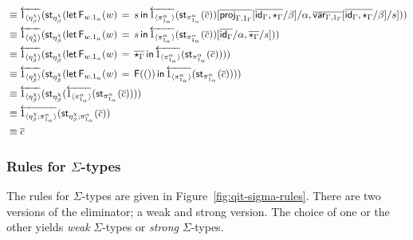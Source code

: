 \documentclass[10pt]{article}
\theoremstyle{definition}
\newcommand{\id}{\mathsf{id}}
\newcommand{\rewrite}[2]{\overleftarrow{#1}(#2)}
\newcommand\StI[2]{\ensuremath{\mathsf{st}_{#1}(#2)}}
\newcommand\FEs[4]{\ensuremath{\mathsf{let} \, \mathsf{F}_{#1}(#3) \, = \, {#2} \, \mathsf{in} \, #4}}
\newcommand\FI[1]{\ensuremath{\mathsf{F}{(#1)}}}
\begin{document}
\begin{enumerate}[style = multiline, labelwidth = 80pt]
\begin{align*}
&\equiv \rewrite{\ApOne{\eta^\chi_\beta}}{\StI{\eta^\chi_\beta}{\FEs{w.1_\alpha}{s}{w}{\rewrite{\ApOne{\pi^\alpha_{1_\alpha}}}{\StI{\pi^\alpha_{1_\alpha}}{\upstairs{c}}}}[\upstairs{\proj{\Gamma, 1_\Gamma}}[\upstairs{\id_\Gamma, \star_\Gamma}/\beta]/\alpha, \upstairs{\qvar{\Gamma, 1_\Gamma}}[\upstairs{\id_\Gamma, \star_\Gamma}/\beta]/s]}} \\
&\equiv \rewrite{\ApOne{\eta^\chi_\beta}}{\StI{\eta^\chi_\beta}{\FEs{w.1_\alpha}{s}{w}{\rewrite{\ApOne{\pi^\alpha_{1_\alpha}}}{\StI{\pi^\alpha_{1_\alpha}}{\upstairs{c}}}}[\upstairs{\id_\Gamma}/\alpha, \upstairs{\star_\Gamma}/s]}} \\
&\equiv \rewrite{\ApOne{\eta^\chi_\beta}}{\StI{\eta^\chi_\beta}{\FEs{w.1_\alpha}{\upstairs{\star_\Gamma}}{w}{\rewrite{\ApOne{\pi^\alpha_{1_\alpha}}}{\StI{\pi^\alpha_{1_\alpha}}{\upstairs{c}}}}}} \\
&\equiv \rewrite{\ApOne{\eta^\chi_\beta}}{\StI{\eta^\chi_\beta}{\FEs{w.1_\alpha}{\FI{()}}{w}{\rewrite{\ApOne{\pi^\alpha_{1_\alpha}}}{\StI{\pi^\alpha_{1_\alpha}}{\upstairs{c}}}}}} \\
&\equiv \rewrite{\ApOne{\eta^\chi_\beta}}{\StI{\eta^\chi_\beta}{\rewrite{\ApOne{\pi^\alpha_{1_\alpha}}}{\StI{\pi^\alpha_{1_\alpha}}{\upstairs{c}}}}} \\
&\equiv \rewrite{\ApOne{\eta^\chi_\beta;\pi^\alpha_{1_\alpha}}}{\StI{\eta^\chi_\beta;\pi^\alpha_{1_\alpha}}{\upstairs{c}}} \\
&\equiv \upstairs{c}
\end{align*}
\end{enumerate}

\subsubsection{Rules for $\Sigma$-types}
\newcommand\qpair[1]{\ensuremath{\mathsf{pair}_{#1}}}
\newcommand\qsplit[1]{\ensuremath{\mathsf{split}_{#1}}}

The rules for $\Sigma$-types are given in Figure~\ref{fig:qit-sigma-rules}. There are two versions of the eliminator; a weak and strong version. The choice of one or the other yields \emph{weak} $\Sigma$-types or \emph{strong} $\Sigma$-types.
\end{document}
